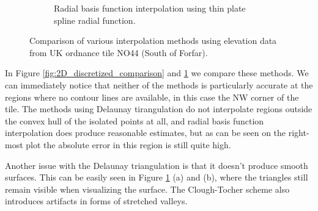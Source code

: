 \documentclass[a4paper,10pt]{report}
\begin{document}
\begin{figure}[H]
\begin{subfigure}{.32\textwidth}
    \caption{Radial basis function interpolation using thin plate spline radial function.}
    \end{subfigure}
    \caption{Comparison of various interpolation methods using elevation data from UK ordnance tile NO44 (South of Forfar).}
    \label{fig:3D_discretized_comparison}
\end{figure}

In Figure \ref{fig:2D_discretized_comparison} and \ref{fig:3D_discretized_comparison} we compare these methods. We can immediately notice that neither of the methods is particularly accurate at the regions where no contour lines are available, in this case the NW corner of the tile. The methods using Delaunay tirangulation do not interpolate regions outside the convex hull of the isolated points at all, and radial basis function interpolation does produce reasonable estimates, but as can be seen on the right-most plot the absolute error in this region is still quite high.

Another issue with the Delaunay triangulation is that it doesn't produce smooth surfaces. This can be easily seen in Figure \ref{fig:3D_discretized_comparison} (a) and (b), where the triangles still remain visible when visualizing the surface. The Clough-Tocher scheme also introduces artifacts in forms of stretched valleys.

\end{document}
